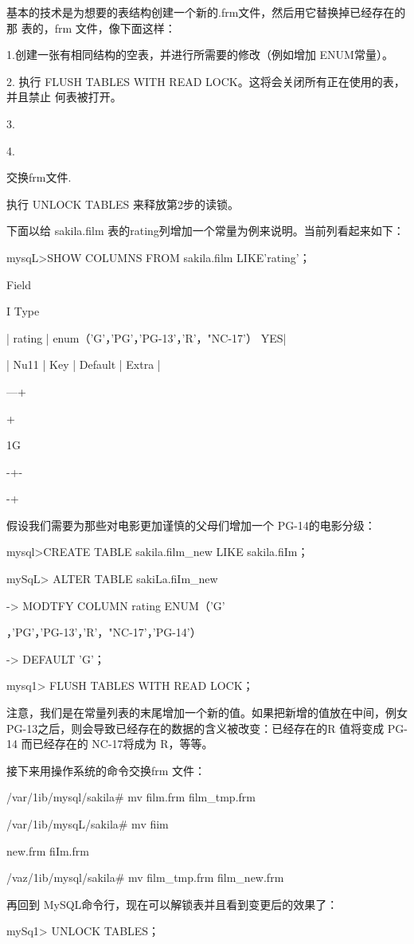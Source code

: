 基本的技术是为想要的表结构创建一个新的.frm文件，然后用它替换掉已经存在的那
表的，frm 文件，像下面这样：

1.创建一张有相同结构的空表，并进行所需要的修改（例如增加 ENUM常量）。

2. 执行 FLUSH TABLES WITH READ LOCK。这将会关闭所有正在使用的表，并且禁止
何表被打开。

3.

4.

交换frm文件.

执行 UNLOCK TABLES 来释放第2步的读锁。

下面以给 sakila.film 表的rating列增加一个常量为例来说明。当前列看起来如下：

mysqL>SHOW COLUMNS FROM sakila.film LIKE'rating'；

Field

I Type

| rating | enum（'G'，'PG'，'PG-13'，'R'，"NC-17'） YES|

| Nu11 | Key | Default | Extra |

---+

+

1G

-+-

-+

假设我们需要为那些对电影更加谨慎的父母们增加一个 PG-14的电影分级：

mysql>CREATE TABLE sakila.film\_new LIKE sakila.fiIm；

mySqL> ALTER TABLE sakiLa.fiIm\_new

-> MODTFY COLUMN rating ENUM（'G'

，'PG'，'PG-13'，'R'，"NC-17'，'PG-14'）

-> DEFAULT 'G'；

mysq1> FLUSH TABLES WITH READ LOCK；

注意，我们是在常量列表的末尾增加一个新的值。如果把新增的值放在中间，例女
PG-13之后，则会导致已经存在的数据的含义被改变：已经存在的R 值将变成 PG-14
而已经存在的 NC-17将成为 R，等等。

接下来用操作系统的命令交换frm 文件：

/var/1ib/mysql/sakila# mv film.frm film\_tmp.frm

/var/1ib/mysqL/sakila# mv fiim

new.frm fiIm.frm

/vaz/1ib/mysql/sakila# mv film\_tmp.frm film\_new.frm

再回到 MySQL命令行，现在可以解锁表并且看到变更后的效果了：

mySq1> UNLOCK TABLES；

